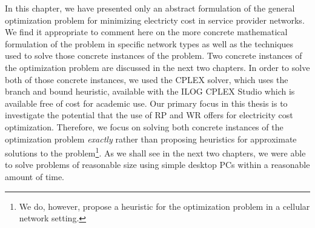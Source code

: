 In this chapter, we have presented only an abstract formulation of the general optimization problem for minimizing electricty cost in service provider networks. We find it appropriate to comment here on the more concrete mathematical formulation of the problem in specific network types as well as the techniques used to solve those concrete instances of the problem. Two concrete instances of the optimization problem are discussed in the next two chapters. In order to solve both of those concrete instances, we used the CPLEX solver, which uses the branch and bound heuristic, available with the ILOG CPLEX Studio which is available free of cost for academic use. Our primary focus in this thesis is to investigate the potential that the use of RP and WR offers for electricity cost optimization. Therefore, we focus on solving both concrete instances of the optimization problem \textit{exactly} rather than proposing heuristics for approximate solutions to the problem\footnote{We do, however, propose a heuristic for the optimization problem in a cellular network setting.}. As we shall see in the next two chapters, we were able to solve problems of reasonable size using simple desktop PCs within a reasonable amount of time.
